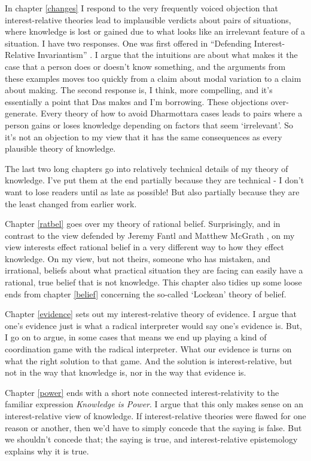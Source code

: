 \documentclass[
  11pt,
]{book}
\begin{document}
In chapter \ref{changes} I respond to the very frequently voiced objection that interest-relative theories lead to implausible verdicts about pairs of situations, where knowledge is lost or gained due to what looks like an irrelevant feature of a situation. I have two responses. One was first offered in ``Defending Interest-Relative Invariantism'' \citep{Weatherson2011-WEADIR}. I argue that the intuitions are about what makes it the case that a person does or doesn't know something, and the arguments from these examples moves too quickly from a claim about modal variation to a claim about making. The second response is, I think, more compelling, and it's essentially a point that Das makes and I'm borrowing. These objections over-generate. Every theory of how to avoid Dharmottara cases leads to pairs where a person gains or loses knowledge depending on factors that seem `irrelevant'. So it's not an objection to my view that it has the same consequences as every plausible theory of knowledge.

The last two long chapters go into relatively technical details of my theory of knowledge. I've put them at the end partially because they are technical - I don't want to lose readers until as late as possible! But also partially because they are the least changed from earlier work.

Chapter \ref{ratbel} goes over my theory of rational belief. Surprisingly, and in contrast to the view defended by Jeremy Fantl and Matthew McGrath \citeyearpar{FantlMcGrath2009}, on my view interests effect rational belief in a very different way to how they effect knowledge. On my view, but not theirs, someone who has mistaken, and irrational, beliefs about what practical situation they are facing can easily have a rational, true belief that is not knowledge. This chapter also tidies up some loose ends from chapter \ref{belief} concerning the so-called `Lockean' theory of belief.

Chapter \ref{evidence} sets out my interest-relative theory of evidence. I argue that one's evidence just is what a radical interpreter would say one's evidence is. But, I go on to argue, in some cases that means we end up playing a kind of coordination game with the radical interpreter. What our evidence is turns on what the right solution to that game. And the solution is interest-relative, but not in the way that knowledge is, nor in the way that evidence is.

Chapter \ref{power} ends with a short note connected interest-relativity to the familiar expression \emph{Knowledge is Power}. I argue that this only makes sense on an interest-relative view of knowledge. If interest-relative theories were flawed for one reason or another, then we'd have to simply concede that the saying is false. But we shouldn't concede that; the saying is true, and interest-relative epistemology explains why it is true.
\end{document}

